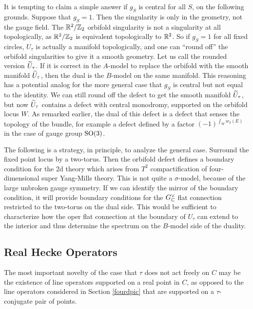 \documentclass[11pt,a4paper]{article}
\begin{document}
It is tempting to claim a simple answer if $g_S$ is central for all $S$, on the following grounds.
 Suppose that $g_S=1$.   Then the singularity is only in the geometry, not the gauge field.
The ${\mathbb{R}}^2/{\mathbb Z}_2$ orbifold singularity is not a singularity at all topologically, as ${\mathbb{R}}^2/{\mathbb Z}_2$ is equivalent topologically to ${\mathbb{R}}^2$.   So if $g_S=1$ for all
fixed circles, $U_\tau$ is actually a manifold topologically, and one can ``round off'' the orbifold singularities to give it a smooth geometry.  Let us call the rounded
version $\widetilde U_\tau$.   If it is correct in the $A$-model to replace the orbifold with the smooth manifold $\widetilde U_\tau$, then the dual is the $B$-model on the same
manifold.   This reasoning has a potential analog for the more general case that $g_S$ is central but not equal to the identity.
We can still round off the defect to get the smooth
manifold $\widetilde U_\tau$, but now  $\widetilde U_\tau$ contains a defect with central monodromy, supported on the orbifold locus $W$.   
As remarked earlier, the dual of this defect is a defect that senses
the topology of the bundle, for example a defect defined by a factor $(-1)^{\int_W
 w_2(E)}$ in the case of gauge group ${\mathrm{SO}}(3)$.


The following is a  strategy, in principle, to analyze the general case.   Surround the fixed point  locus by a two-torus. Then the orbifold defect defines 
a boundary condition for the 2d theory which arises from  $T^2$ compactification of four-dimensional super Yang-Mills theory. 
This is not quite a $\sigma$-model, because of the 
large unbroken gauge symmetry. If we can identify the mirror of the boundary condition, it will provide boundary conditions for the 
$G^\vee_{\mathbb C}$ flat connection restricted to the two-torus on the dual side. This would be sufficient to characterize how the oper flat connection 
at the boundary of $U_\tau$ can extend to the interior and thus determine the spectrum on the $B$-model side of the duality. 



\subsection{Real Hecke Operators}\label{rho}

The most important novelty of the case that $\tau$ does not act freely on $C$ may be the existence of line operators supported on a real point in $C$,
as opposed to the line operators considered in Section \ref{fourdpic} that are supported on a $\tau$-conjugate pair of points.
\end{document}
